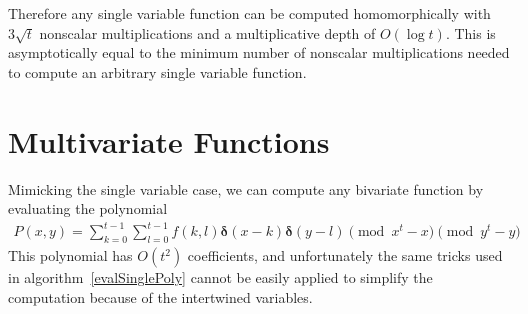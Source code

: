 \documentclass{article}
\begin{document}
    Therefore any single variable function can be computed homomorphically with
    $3\sqrt{t}$ nonscalar multiplications and a multiplicative depth of $O(\log t)$.
    This is asymptotically equal to the minimum number of nonscalar multiplications needed to compute an arbitrary single variable function.

    \section{Multivariate Functions}
    \label{multi}
        Mimicking the single variable case,
        we can compute any bivariate function by evaluating the polynomial
        \begin{align}
            P(x,y)
            =
            \sum_{k = 0}^{t - 1}
            \sum_{l = 0}^{t - 1}
            f(k, l)
            \mathbf{\delta}(x - k)
            \mathbf{\delta}(y - l)
            \pmod{x^t - x}
            \pmod{y^t - y}
        \end{align}
        This polynomial has $O(t^2)$ coefficients, and unfortunately the same tricks used in algorithm~\ref{evalSinglePoly}
        cannot be easily applied to simplify the computation because of the intertwined variables.
\end{document}
